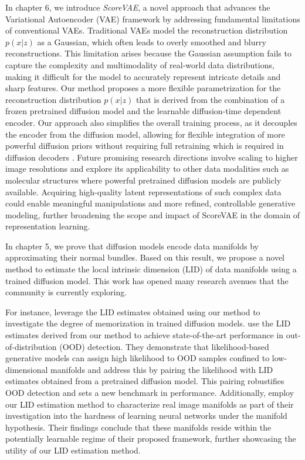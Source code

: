 In chapter 6, we introduce \emph{ScoreVAE}, a novel approach that advances the Variational Autoencoder (VAE) framework by addressing fundamental limitations of conventional VAEs. Traditional VAEs model the reconstruction distribution $p(x|z)$ as a Gaussian, which often leads to overly smoothed and blurry reconstructions. This limitation arises because the Gaussian assumption fails to capture the complexity and multimodality of real-world data distributions, making it difficult for the model to accurately represent intricate details and sharp features. Our method proposes a more flexible parametrization for the reconstruction distribution $p(x|z)$ that is derived from the combination of a frozen pretrained diffusion model and the learnable diffusion-time dependent encoder. Our approach also simplifies the overall training process, as it decouples the encoder from the diffusion model, allowing for flexible integration of more powerful diffusion priors without requiring full retraining which is required in diffusion decoders \cite{preechakul2022diffusion_decoder}. Future promising research directions involve scaling to higher image resolutions and explore its applicability to other data modalities such as molecular structures where powerful pretrained diffusion models are publicly available. Acquiring high-quality latent representations of such complex data could enable meaningful manipulations and more refined, controllable generative modeling, further broadening the scope and impact of ScoreVAE in the domain of representation learning.

In chapter 5, we prove that diffusion models encode data manifolds by approximating their normal bundles. Based on this result, we propose a novel method to estimate the local intrinsic dimension (LID) of data manifolds using a trained diffusion model. This work has opened many research avenues that the community is currently exploring.

For instance, \citet{achilli2024losing} leverage the LID estimates obtained using our method to investigate the degree of memorization in trained diffusion models. \citet{kamkari2024geometric} use the LID estimates derived from our method to achieve state-of-the-art performance in out-of-distribution (OOD) detection. They demonstrate that likelihood-based generative models can assign high likelihood to OOD samples confined to low-dimensional manifolds and address this by pairing the likelihood with LID estimates obtained from a pretrained diffusion model. This pairing robustifies OOD detection and sets a new benchmark in performance. Additionally, \citet{kiani2024hardness} employ our LID estimation method to characterize real image manifolds as part of their investigation into the hardness of learning neural networks under the manifold hypothesis. Their findings conclude that these manifolds reside within the potentially learnable regime of their proposed framework, further showcasing the utility of our LID estimation method.

